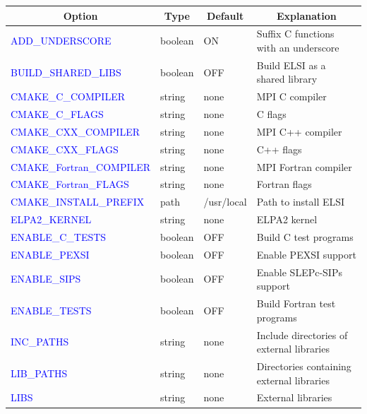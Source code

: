 \documentclass{report}
\begin{document}
\begin{tabular}[]{|p{50mm}|p{15mm}|p{20mm}|p{80mm}|}
\hline
\multicolumn{1}{|c|}{\textbf{Option}} & \multicolumn{1}{c|}{\textbf{Type}} & \multicolumn{1}{c|}{\textbf{Default}} & \multicolumn{1}{c|}{\textbf{Explanation}}\\
\hline
\textcolor{blue}{ADD\_UNDERSCORE}            & boolean & ON          & Suffix C functions with an underscore\\
\hline
\textcolor{blue}{BUILD\_SHARED\_LIBS}        & boolean & OFF         & Build ELSI as a shared library\\
\hline
\textcolor{blue}{CMAKE\_C\_COMPILER}         & string  & none        & MPI C compiler\\
\hline
\textcolor{blue}{CMAKE\_C\_FLAGS}            & string  & none        & C flags\\
\hline
\textcolor{blue}{CMAKE\_CXX\_COMPILER}       & string  & none        & MPI C++ compiler\\
\hline
\textcolor{blue}{CMAKE\_CXX\_FLAGS}          & string  & none        & C++ flags\\
\hline
\textcolor{blue}{CMAKE\_Fortran\_COMPILER}   & string  & none        & MPI Fortran compiler\\
\hline
\textcolor{blue}{CMAKE\_Fortran\_FLAGS}      & string  & none        & Fortran flags\\
\hline
\textcolor{blue}{CMAKE\_INSTALL\_PREFIX}     & path    & /usr/local  & Path to install ELSI\\
\hline
\textcolor{blue}{ELPA2\_KERNEL}              & string  & none        & ELPA2 kernel\\
\hline
\textcolor{blue}{ENABLE\_C\_TESTS}           & boolean & OFF         & Build C test programs\\
\hline
\textcolor{blue}{ENABLE\_PEXSI}              & boolean & OFF         & Enable PEXSI support\\
\hline
\textcolor{blue}{ENABLE\_SIPS}               & boolean & OFF         & Enable SLEPc-SIPs support\\
\hline
\textcolor{blue}{ENABLE\_TESTS}              & boolean & OFF         & Build Fortran test programs\\
\hline
\textcolor{blue}{INC\_PATHS}                 & string  & none        & Include directories of external libraries\\
\hline
\textcolor{blue}{LIB\_PATHS}                 & string  & none        & Directories containing external libraries\\
\hline
\textcolor{blue}{LIBS}                       & string  & none        & External libraries\\

\end{tabular}
\end{document}
